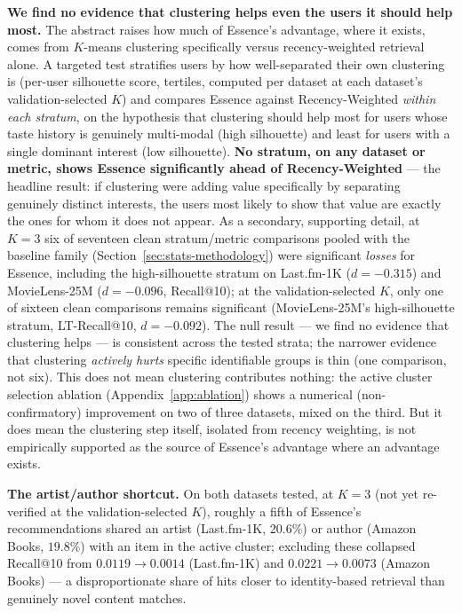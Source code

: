 \documentclass{article}
\begin{document}
\textbf{We find no evidence that clustering helps even the users it should help most.} The abstract raises how much of Essence's advantage, where it exists, comes from $K$-means clustering specifically versus recency-weighted retrieval alone. A targeted test stratifies users by how well-separated their own clustering is (per-user silhouette score, tertiles, computed per dataset at each dataset's validation-selected $K$) and compares Essence against Recency-Weighted \emph{within each stratum}, on the hypothesis that clustering should help most for users whose taste history is genuinely multi-modal (high silhouette) and least for users with a single dominant interest (low silhouette). \textbf{No stratum, on any dataset or metric, shows Essence significantly ahead of Recency-Weighted} --- the headline result: if clustering were adding value specifically by separating genuinely distinct interests, the users most likely to show that value are exactly the ones for whom it does not appear. As a secondary, supporting detail, at $K=3$ six of seventeen clean stratum/metric comparisons pooled with the baseline family (Section~\ref{sec:stats-methodology}) were significant \emph{losses} for Essence, including the high-silhouette stratum on Last.fm-1K ($d=-0.315$) and MovieLens-25M ($d=-0.096$, Recall@10); at the validation-selected $K$, only one of sixteen clean comparisons remains significant (MovieLens-25M's high-silhouette stratum, LT-Recall@10, $d=-0.092$). The null result --- we find no evidence that clustering helps --- is consistent across the tested strata; the narrower evidence that clustering \emph{actively hurts} specific identifiable groups is thin (one comparison, not six). This does not mean clustering contributes nothing: the active cluster selection ablation (Appendix~\ref{app:ablation}) shows a numerical (non-confirmatory) improvement on two of three datasets, mixed on the third. But it does mean the clustering step itself, isolated from recency weighting, is not empirically supported as the source of Essence's advantage where an advantage exists.

\textbf{The artist/author shortcut.} On both datasets tested, at $K=3$ (not yet re-verified at the validation-selected $K$), roughly a fifth of Essence's recommendations shared an artist (Last.fm-1K, $20.6\%$) or author (Amazon Books, $19.8\%$) with an item in the active cluster; excluding these collapsed Recall@10 from $0.0119\to0.0014$ (Last.fm-1K) and $0.0221\to0.0073$ (Amazon Books) --- a disproportionate share of hits closer to identity-based retrieval than genuinely novel content matches.
\end{document}
